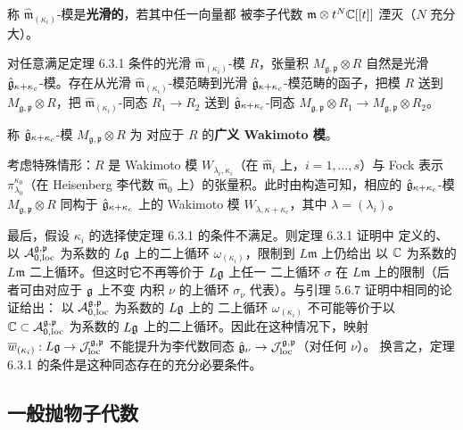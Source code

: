称 $\widehat{\mathfrak m}_{(\kappa_i)}$-模是\textbf{光滑的}，若其中任一向量都
被李子代数 $\mathfrak m\otimes t^N\mathbb{C}[[t]]$ 湮灭（$N$ 充分大）。

\renewcommand{\thecorollary}{6.3.2}
\begin{corollary}
    对任意满足定理 6.3.1 条件的光滑
    $\widehat{\mathfrak m}_{(\kappa_i)}$-模 $R$，张量积
    $M_{\mathfrak g,\mathfrak p}\otimes R$ 自然是光滑
    $\hat{\mathfrak{g}}_{\kappa+\kappa_c}$-模。存在从光滑
    $\widehat{\mathfrak m}_{(\kappa_i)}$-模范畴到光滑
    $\hat{\mathfrak{g}}_{\kappa+\kappa_c}$-模范畴的函子，把模 $R$ 送到
    $M_{\mathfrak g,\mathfrak p}\otimes R$，把
    $\widehat{\mathfrak m}_{(\kappa_i)}$-同态 $R_1\to R_2$ 送到
    $\hat{\mathfrak{g}}_{\kappa+\kappa_c}$-同态
    $M_{\mathfrak g,\mathfrak p}\otimes R_1\to
    M_{\mathfrak g,\mathfrak p}\otimes R_2$。
\end{corollary}

称 $\hat{\mathfrak{g}}_{\kappa+\kappa_c}$-模 $M_{\mathfrak g,\mathfrak p}\otimes R$ 为
对应于 $R$ 的\textbf{广义 Wakimoto 模}。

考虑特殊情形：$R$ 是 Wakimoto 模 $W_{\lambda_i,\kappa_i}$（在
$\widehat{\mathfrak m}_i$ 上，$i=1,\dots,s$）与 Fock 表示
$\pi^{\kappa_0}_{\lambda_0}$（在 Heisenberg 李代数
$\widehat{\mathfrak m}_0$ 上）的张量积。此时由构造可知，相应的
$\hat{\mathfrak{g}}_{\kappa+\kappa_c}$-模
$M_{\mathfrak g,\mathfrak p}\otimes R$ 同构于
$\hat{\mathfrak{g}}_{\kappa+\kappa_c}$ 上的 Wakimoto 模
$W_{\lambda,\kappa+\kappa_c}$，其中 $\lambda=(\lambda_i)$。

最后，假设 $\kappa_i$ 的选择使定理 6.3.1 的条件不满足。则定理 6.3.1 证明中
定义的、以 $\mathcal{A}^{\mathfrak g,\mathfrak p}_{0,\mathrm{loc}}$ 为系数的
$L\mathfrak{g}$ 上的二上循环 $\omega_{(\kappa_i)}$，限制到 $L\mathfrak m$ 上仍给出
以 $\mathbb{C}$ 为系数的 $L\mathfrak m$ 二上循环。但这时它不再等价于 $L\mathfrak{g}$ 上任一
二上循环 $\sigma$ 在 $L\mathfrak m$ 上的限制（后者可由对应于 $\mathfrak{g}$ 上不变
内积 $\nu$ 的上循环 $\sigma_\nu$ 代表）。与引理 5.6.7 证明中相同的论证给出：
以 $\mathcal{A}^{\mathfrak g,\mathfrak p}_{0,\mathrm{loc}}$ 为系数的 $L\mathfrak{g}$ 上的
二上循环 $\omega_{(\kappa_i)}$ 不可能等价于以
$\mathbb{C}\subset\mathcal{A}^{\mathfrak g,\mathfrak p}_{0,\mathrm{loc}}$ 为系数的
$L\mathfrak{g}$ 上的二上循环。因此在这种情况下，映射
$\overline w_{(\kappa_i)}:L\mathfrak{g}\to
\mathcal{J}^{\mathfrak g,\mathfrak p}_{\mathrm{loc}}$ 不能提升为李代数同态
$\hat{\mathfrak{g}}_\nu\to\mathcal{J}^{\mathfrak g,\mathfrak p}_{\mathrm{loc}}$（对任何 $\nu$）。
换言之，定理 6.3.1 的条件是这种同态存在的充分必要条件。

\subsection{一般抛物子代数}

